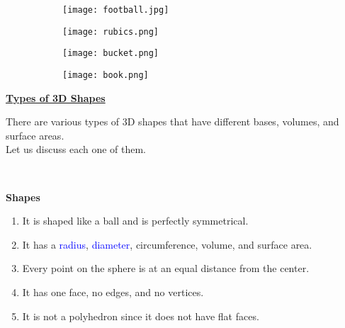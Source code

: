 \documentclass[12pt a4paper]{article}
\begin{document}
\begin{figure}[h]
    \centering
    \begin{subfigure}
    \centering
    \texttt{[image: football.jpg]}
    \end{subfigure}
    \hspace{5em}
    \begin{subfigure}
    \centering
    \texttt{[image: rubics.png]}
    \label{Figs}
    \end{subfigure}
\end{figure}
\begin{figure}[h]
    \centering
    \begin{subfigure}
    \centering
    \texttt{[image: bucket.png]}
    \end{subfigure}
    \hspace{5em}
    \begin{subfigure}
    \centering
    \texttt{[image: book.png]}
    \label{Figs1}
    \end{subfigure}
\end{figure}


\begin{huge}
\noindent
\Large\textbf{\uline{Types of 3D Shapes}}\\
\end{huge}

\begin{huge}
\noindent \LARGE
There are various types of 3D shapes that have different bases, volumes, and surface areas. \\ Let us discuss each one of them.
\end{huge} \\

\newpage

\noindent
\LARGE \textbf{Shapes}

\begin{enumerate}[label=\arabic*.]
    \item It is shaped like a ball and is perfectly symmetrical.
    \item It has a \textcolor{blue}{radius}, \textcolor{blue}{diameter}, circumference, volume, and surface area.
    \item Every point on the sphere is at an equal distance from the center.
    \item It has one face, no edges, and no vertices.
    \item It is not a polyhedron since it does not have flat faces.
\end{enumerate}
\end{document}
